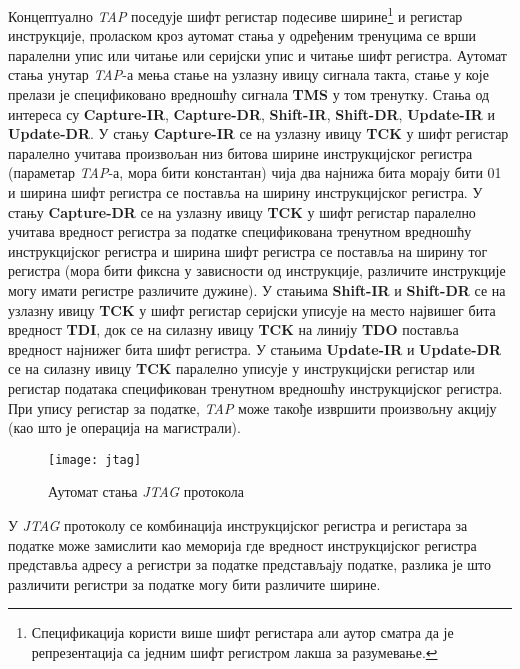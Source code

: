 Концептуално \textit{\acrshort{TAP}} поседује шифт регистар подесиве ширине\footnote{Спецификација користи више шифт регистара али аутор сматра да је репрезентација са једним шифт регистром лакша за разумевање.} и регистар инструкције, проласком кроз аутомат стања у одређеним тренуцима се врши паралелни упис или читање или серијски упис и читање шифт регистра. Аутомат стања унутар \textit{\acrshort{TAP}}-а мења стање на узлазну ивицу сигнала такта, стање у које прелази је спецификовано вредношћу сигнала \textbf{\acrshort{TMS}} у том тренутку.
Стања од интереса су \textbf{Capture-\acrshort{IR}}, \textbf{Capture-\acrshort{DR}}, \textbf{Shift-\acrshort{IR}}, \textbf{Shift-\acrshort{DR}}, \textbf{Update-\acrshort{IR}} и \textbf{Update-\acrshort{DR}}. 
У стању \textbf{Capture-\acrshort{IR}} се на узлазну ивицу \textbf{\acrshort{TCK}} у шифт регистар паралелно учитава произвољан низ битова ширине инструкцијског регистра (параметар \textit{\acrshort{TAP}}-а, мора бити константан) чија два најнижа бита морају бити 01 и ширина шифт регистра се поставља на ширину инструкцијског регистра. У стању \textbf{Capture-\acrshort{DR}} се на узлазну ивицу \textbf{\acrshort{TCK}} у шифт регистар паралелно учитава вредност регистра за податке спецификована тренутном вредношћу инструкцијског регистра и ширина шифт регистра се поставља на ширину тог регистра (мора бити фиксна у зависности од инструкције, различите инструкције могу имати регистре различите дужине). У стањима \textbf{Shift-\acrshort{IR}} и \textbf{Shift-\acrshort{DR}} се на узлазну ивицу \textbf{\acrshort{TCK}} у шифт регистар серијски уписује на место највишег бита вредност \textbf{\acrshort{TDI}}, док се на силазну ивицу \textbf{\acrshort{TCK}} на линију \textbf{\acrshort{TDO}} поставља вредност најнижег бита шифт регистра. У стањима \textbf{Update-\acrshort{IR}} и \textbf{Update-\acrshort{DR}} се на силазну ивицу \textbf{\acrshort{TCK}} паралелно уписује у инструкцијски регистар или регистар података спецификован тренутном вредношћу инструкцијског регистра. При упису регистар за податке, \textit{\acrshort{TAP}} може такође извршити произвољну акцију (као што је операција на магистрали).

\begin{figure}[h!]
	\centering
	\texttt{[image: jtag]}
	\caption{Аутомат стања \textit{\acrshort{JTAG}} протокола \cite{jtag_spec}}
	\label{fig:jtag}
\end{figure}

У \textit{\acrshort{JTAG}} протоколу се комбинација инструкцијског регистра и регистара за податке може замислити као меморија где вредност инструкцијског регистра представља адресу а регистри за податке представљају податке, разлика је што различити регистри за податке могу бити различите ширине.

